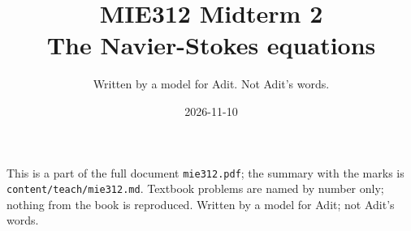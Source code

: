 
\title{MIE312 Midterm 2\\[0.3em]\large The Navier-Stokes equations}
\author{Written by a model for Adit. Not Adit's words.}
\date{2026-11-10}

\maketitle
\begin{sloppypar}\noindent\small This is a part of the full document \texttt{mie312.pdf}; the summary with the marks is \texttt{content/teach/mie312.md}. Textbook problems are named by number only; nothing from the book is reproduced. Written by a model for Adit; not Adit's words.\normalsize\end{sloppypar}



